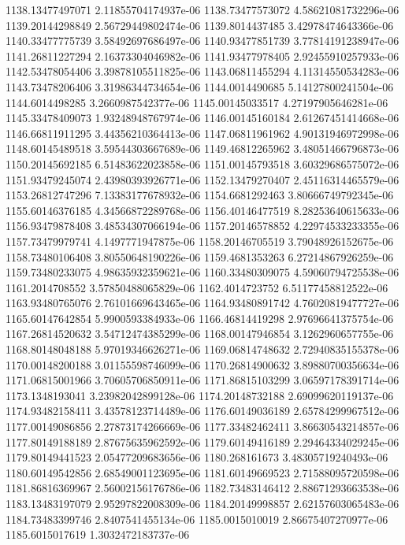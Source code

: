 {1138.13477497071 2.11855704174937e-06
1138.73477573072 4.58621081732296e-06
1139.20144298849 2.56729449802474e-06
1139.8014437485 3.42978474643366e-06
1140.33477775739 3.58492697686497e-06
1140.93477851739 3.77814191238947e-06
1141.26811227294 2.16373304046982e-06
1141.93477978405 2.92455910257933e-06
1142.53478054406 3.39878105511825e-06
1143.06811455294 4.11314550534283e-06
1143.73478206406 3.31986344734654e-06
1144.0014490685 5.14127800241504e-06
1144.6014498285 3.2660987542377e-06
1145.00145033517 4.27197905646281e-06
1145.33478409073 1.93248948767974e-06
1146.00145160184 2.61267451414668e-06
1146.66811911295 3.44356210364413e-06
1147.06811961962 4.90131946972998e-06
1148.60145489518 3.59544303667689e-06
1149.46812265962 3.48051466796873e-06
1150.20145692185 6.51483622023858e-06
1151.00145793518 3.60329686575072e-06
1151.93479245074 2.43980393926771e-06
1152.13479270407 2.45116314465579e-06
1153.26812747296 7.13383177678932e-06
1154.6681292463 3.80666749792345e-06
1155.60146376185 4.34566872289768e-06
1156.40146477519 8.28253640615633e-06
1156.93479878408 3.48534307066194e-06
1157.20146578852 4.22974533233355e-06
1157.73479979741 4.1497771947875e-06
1158.20146705519 3.79048926152675e-06
1158.73480106408 3.80550648190226e-06
1159.4681353263 6.27214867926259e-06
1159.73480233075 4.98635932359621e-06
1160.33480309075 4.59060794725538e-06
1161.2014708552 3.57850488065829e-06
1162.4014723752 6.51177458812522e-06
1163.93480765076 2.76101669643465e-06
1164.93480891742 4.76020819477727e-06
1165.60147642854 5.9900593384933e-06
1166.46814419298 2.97696641375754e-06
1167.26814520632 3.54712474385299e-06
1168.00147946854 3.1262960657755e-06
1168.80148048188 5.97019346626271e-06
1169.06814748632 2.72940835155378e-06
1170.00148200188 3.01155598746099e-06
1170.26814900632 3.89880700356634e-06
1171.06815001966 3.70605706850911e-06
1171.86815103299 3.06597178391714e-06
1173.1348193041 3.23982042899128e-06
1174.20148732188 2.69099620119137e-06
1174.93482158411 3.43578123714489e-06
1176.60149036189 2.65784299967512e-06
1177.00149086856 2.27873174266669e-06
1177.33482462411 3.86630543214857e-06
1177.80149188189 2.87675635962592e-06
1179.60149416189 2.29464334029245e-06
1179.80149441523 2.05477209683656e-06
1180.268161673 3.48305719240493e-06
1180.60149542856 2.68549001123695e-06
1181.60149669523 2.71588095720598e-06
1181.86816369967 2.56002156176786e-06
1182.73483146412 2.88671293663538e-06
1183.13483197079 2.95297822008309e-06
1184.20149998857 2.62157603065483e-06
1184.73483399746 2.8407541455134e-06
1185.0015010019 2.86675407270977e-06
1185.6015017619 1.3032472183737e-06
}
